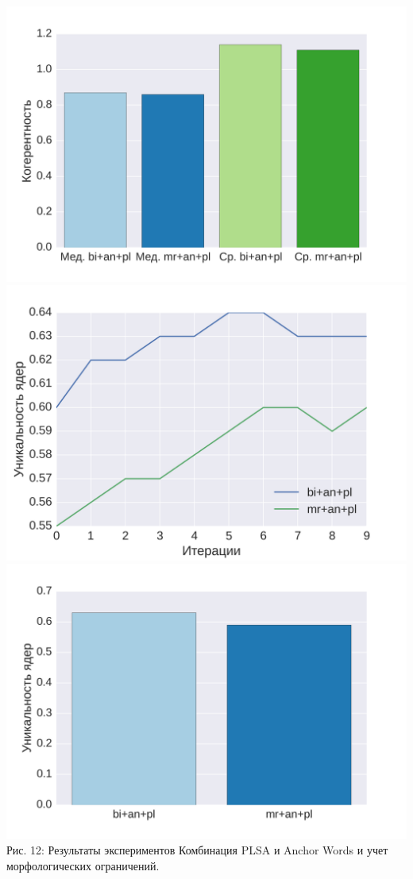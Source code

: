 \documentclass[a4paper, 14pt]{extarticle}
\begin{document}
\includegraphics[scale=0.43]{img/bi/6}\\
\includegraphics[scale=0.43]{img/bi/4}
\includegraphics[scale=0.43]{img/bi/7}
Рис. 12: Результаты экспериментов Комбинация PLSA и Anchor Words и учет морфологических ограничений.
\end{document}

